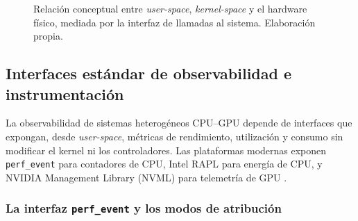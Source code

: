 \documentclass[12pt,oneside,spanish]{book}
\begin{document}
\begin{figure}[H]
\caption[Espacios de usuario y de kernel]{Relación conceptual entre \textit{user-space}, \textit{kernel-space} y el hardware físico, mediada por la interfaz de llamadas al sistema. Elaboración propia.}
\label{fig:user-kernel-space}
\end{figure}

\subsection{Interfaces estándar de observabilidad e instrumentación}

La observabilidad de sistemas heterogéneos CPU--GPU depende de interfaces que expongan, desde \textit{user-space}, métricas de rendimiento, utilización y consumo sin modificar el kernel ni los controladores. Las plataformas modernas exponen \texttt{perf\_event} para contadores de CPU, Intel RAPL para energía de CPU, y NVIDIA Management Library (NVML) para telemetría de GPU \cite{Calore2017,Weaver2015,David2010,NVML2026}.

\subsubsection{La interfaz \texttt{perf\_event} y los modos de atribución}
\label{sec:perfevent}
\end{document}
